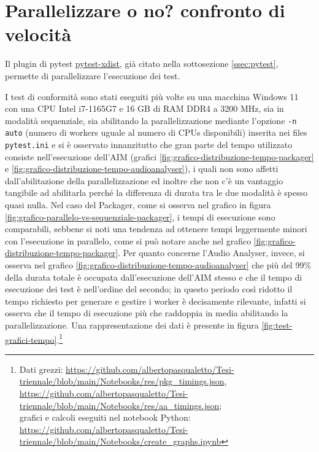 \section{Parallelizzare o no? confronto di velocità} \label{sec:parallelizzazione}
Il plugin di pytest \href{https://pytest-xdist.readthedocs.io/}{pytest-xdist}, già citato nella sottosezione \ref{ssec:pytest}, permette di parallelizzare l'esecuzione dei test.

I test di conformità sono stati eseguiti più volte su una macchina Windows 11 con una CPU Intel i7-1165G7 e 16 GB di RAM DDR4 a 3200 MHz, sia in modalità sequenziale, sia abilitando la parallelizzazione mediante l'opzione \texttt{-n auto} (numero di workers uguale al numero di CPUs disponibili) inserita nei files \texttt{pytest.ini} e si è osservato innanzitutto che gran parte del tempo utilizzato consiste nell'esecuzione dell'\ac{AIM} (grafici \ref{fig:grafico-distribuzione-tempo-packager} e \ref{fig:grafico-distribuzione-tempo-audioanalyser}), i quali non sono affetti dall'abilitazione della parallelizzazione ed inoltre che non c'è un vantaggio tangibile ad abilitarla perché la differenza di durata tra le due modalità è spesso quasi nulla.
Nel caso del Packager, come si osserva nel grafico in figura \ref{fig:grafico-parallelo-vs-sequenziale-packager}, i tempi di esecuzione sono comparabili, sebbene si noti una tendenza ad ottenere tempi leggermente minori con l'esecuzione in parallelo, come si può notare anche nel grafico \ref{fig:grafico-distribuzione-tempo-packager}. Per quanto concerne l'Audio Analyser, invece, si osserva nel grafico \ref{fig:grafico-distribuzione-tempo-audioanalyser} che più del 99\% della durata totale è occupata dall'esecuzione dell'\ac{AIM} stesso e che il tempo di esecuzione dei test è nell'ordine del secondo; in questo periodo così ridotto il tempo richiesto per generare e gestire i worker è decisamente rilevante, infatti si osserva che il tempo di esecuzione più che raddoppia in media abilitando la parallelizzazione. 
Una rappresentazione dei dati è presente in figura \ref{fig:test-grafici-tempo}.\footnote{Dati grezzi: \url{https://github.com/albertopasqualetto/Tesi-triennale/blob/main/Notebooks/res/pkg_timings.json}, \url{https://github.com/albertopasqualetto/Tesi-triennale/blob/main/Notebooks/res/aa_timings.json};\\
grafici e calcoli eseguiti nel notebook Python: \url{https://github.com/albertopasqualetto/Tesi-triennale/blob/main/Notebooks/create_graphs.ipynb}}

